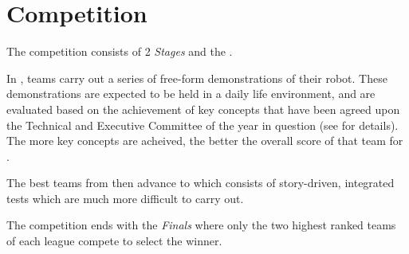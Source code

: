 \section{Competition}
The competition consists of 2 \emph{Stages} and the .

In , teams carry out a series of free-form demonstrations of their robot. These demonstrations are expected to be held in a daily life environment, and are evaluated based on the achievement of key concepts that have been agreed upon the Technical and Executive Committee of the year in question (see  for details). The more key concepts are acheived, the better the overall score of that team for .

The best teams from  then advance to  which consists of story-driven, integrated tests which are much more difficult to carry out.

The competition ends with the \emph{Finals} where only the two highest ranked teams of each league compete to select the winner.
